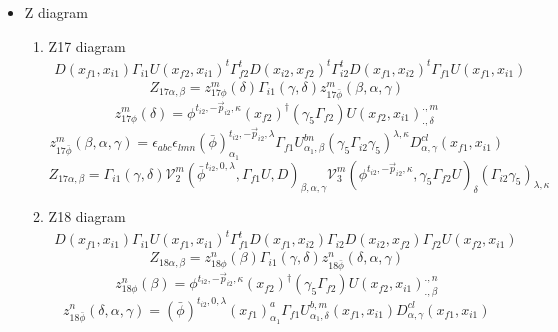 \documentclass{article}[12pt]
\begin{document}
\begin{itemize}
\begin{enumerate}
$$
\phi_d(x_{f1}^{i2})(\gamma_5\phi_u(x_{i1})\gamma_5\Gamma_{i2})^\dagger
\Gamma_{i1}(\Gamma_{f1}U(x_{f1},x_{i1}))^t\phi_d(x_{f1})(\gamma_5\phi_d(x_{i1})\gamma_5\Gamma_{f2})^\dagger 
$$
$$
V_6=\phi_d(x_{f1}^{i2})_{\alpha}(\Gamma_{f1}^t\phi_d(x_{f1}))_{\sigma}(U(x_{f1},x_{i1})_{\sigma\delta}
$$
$$
V_5(\gamma_5\phi_d\gamma_5\Gamma_{f2},\gamma_5\phi_u\gamma_5\Gamma_{i2})_{\beta\gamma}\Gamma_{i1}(\gamma\delta)V_6(\phi_d^{i2}, (\Gamma_f1^t\phi_d)U)_{\alpha\delta}
$$
$$
{\mathcal V}_5(i2,f2)_{\gamma\beta}{\mathcal V}_6(i2,f2)_{\alpha\delta}(phidi2,phidf2U)
$$
\end{enumerate}
\item Z diagram
\begin{enumerate}
\item Z17 diagram
\begin{eqnarray}
D(x_{f1},x_{i1})\Gamma_{i1}U(x_{f2},x_{i1})^t\Gamma_{f2}^tD(x_{i2},x_{f2})^t\Gamma_{i2}^tD(x_{f1},x_{i2})^t\Gamma_{f1}U(x_{f1},x_{i1})
\end{eqnarray}
$$
Z_{17\alpha,\beta}=z_{17\phi}^{m}\left(\delta\right)\Gamma_{i1}\left(\gamma,\delta\right)z_{17\bar{\phi}}^{m}\left(\beta,\alpha,\gamma\right)
$$
$$
z_{17\phi}^{m}\left(\delta\right)=
\phi^{t_{i2},-\vec{p}_{i2},\kappa}\left(x_{f2}\right)^{\dagger}\left(\gamma_5\Gamma_{f2}\right)U\left(x_{f2},x_{i1}\right)^{.,m}_{.,\delta}
$$
$$
z_{17\bar{\phi}}^{m}\left(\beta,\alpha,\gamma\right)=\epsilon_{abc}\epsilon_{lmn}\left(\bar{\phi}\right)^{t_{i2},-\vec{p}_{i2},\lambda}_{\alpha_1}\Gamma_{f1}U^{bn}_{\alpha_1,\beta}\left(\gamma_5\Gamma_{i2}\gamma_5\right)^{\lambda,\kappa}D^{cl}_{\alpha,\gamma}\left(x_{f1},x_{i1}\right)
$$
$$
Z_{17\alpha,\beta}=\Gamma_{i1}\left(\gamma,\delta\right){\mathcal V}^{m}_{2}\left(\bar{\phi}^{t_{i2},0,\lambda},\Gamma_{f1}U,D\right)_{\beta,\alpha,\gamma}{\mathcal V}^{m}_{3}\left(\phi^{t_{i2},-\vec{p}_{i2},\kappa},\gamma_5\Gamma_{f2}U\right)_{\delta}\left(\Gamma_{i2}\gamma_5\right)_{\lambda,\kappa}
$$
\item Z18 diagram
\begin{eqnarray}
D(x_{f1},x_{i1})\Gamma_{i1}U(x_{f1},x_{i1})^t\Gamma_{f1}^tD(x_{f1},x_{i2})\Gamma_{i2}D(x_{i2},x_{f2})\Gamma_{f2}U(x_{f2},x_{i1})
\end{eqnarray}
$$
Z_{18\alpha,\beta}=z_{18\phi}^{n}\left(\beta\right)\Gamma_{i1}\left(
\gamma,\delta\right)z_{18\bar{\phi}}^{n}\left(\delta,\alpha,\gamma\right)
$$
$$
z_{18\phi}^{n}\left(\beta\right)=\phi^{t_{i2},-\vec{p}_{i2},\kappa}\left(x_{f2}\right)^{\dagger}\left(\gamma_5\Gamma_{f2}\right)U\left(x_{f2},x_{i1}\right)^{.,n}_{.,\beta}
$$
$$
z_{18\bar{\phi}}^{n}\left(\delta,\alpha,\gamma\right)=\left(\bar{\phi}\right)^{t_{i2},0,\lambda}\left(x_{f1}\right)^{a}_{\alpha_1}\Gamma_{f1}U_{\alpha_1,\delta}^{b,m}\left(x_{f1},x_{i1}\right)D^{cl}_{\alpha,\gamma}\left(x_{f1},x_{i1}\right)
$$
\end{enumerate}
\end{itemize}
\end{document}
